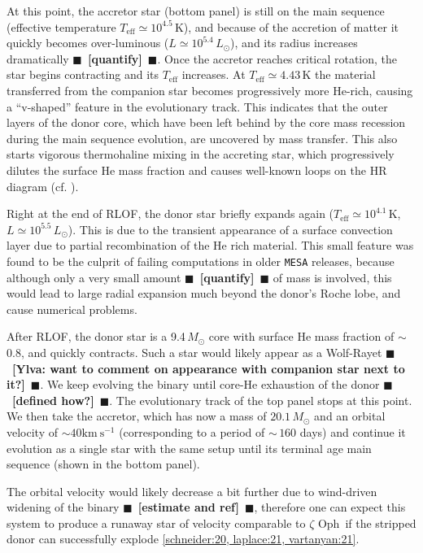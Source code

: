 \documentclass[twocolumn,twocolappendix,trackchanges]{aastex63}
\newcommand{\kms}{{\mathrm{km\ s^{-1}}}}
\newcommand{\zoph}{$\zeta$ Oph}
\newcommand{\todo}[1]{{\large $\blacksquare$~\textbf{\color{red}[#1]}}~$\blacksquare$}
\begin{document}
At this point, the accretor star (bottom panel) is still on the main sequence
(effective temperature $T_\mathrm{eff}\simeq10^{4.5}$\,K), and because of the accretion of
matter it quickly becomes over-luminous ($L\simeq10^{5.4}\,L_\odot$),
and its radius increases dramatically \todo{quantify}. Once the
accretor reaches critical rotation, the star begins contracting and
its $T_\mathrm{eff}$ increases. At $T_\mathrm{eff}\simeq 4.{43}$\,K
the material transferred from the companion star becomes progressively
more He-rich, causing a ``v-shaped'' feature in the evolutionary
track. This indicates that the outer layers of the donor core, which
have been left behind by the core mass recession during the main
sequence evolution, are uncovered by mass transfer. This also starts
vigorous thermohaline mixing in the accreting star, which
progressively dilutes the surface He mass fraction and causes
well-known loops on the HR diagram (cf. \citealt{cantiello:07}).

Right at the end of RLOF, the donor star briefly expands again
($T_\mathrm{eff}\simeq10^{4.1}$\,K, $L\simeq10^{5.5}\,L_\odot$). This
is due to the transient appearance of a surface convection layer due
to partial recombination of the He rich material. This small feature
was found to be the culprit of failing computations in older
\texttt{MESA} releases, because although only a very small amount
\todo{quantify} of mass is involved, this would lead to large radial
expansion much beyond the donor's Roche lobe, and cause numerical
problems.


After RLOF, the donor star is a 9.4$\,M_\odot$ core with surface He
mass fraction of $\sim$0.8, and quickly contracts. Such a star would
likely appear as a Wolf-Rayet \todo{Ylva: want to comment on
  appearance with companion star next to it?}. We keep evolving the
binary until core-He exhaustion of the donor \todo{defined how?}. The
evolutionary track of the top panel stops at this point.  We then take
the accretor, which has now a mass of $20.1\,M_\odot$ and an orbital
velocity of $\sim 40\kms$ (corresponding to a period of $\sim\,160$
days) and continue it evolution as a single star
with the same setup until its terminal age main sequence (shown in the
bottom panel).

The orbital velocity would likely decrease a bit further due to
wind-driven widening of the binary \todo{estimate and ref}, therefore
one can expect this system to produce a runaway star of velocity
comparable to \zoph\ if the stripped donor can successfully explode
\ref{schneider:20, laplace:21, vartanyan:21}.
\end{document}
